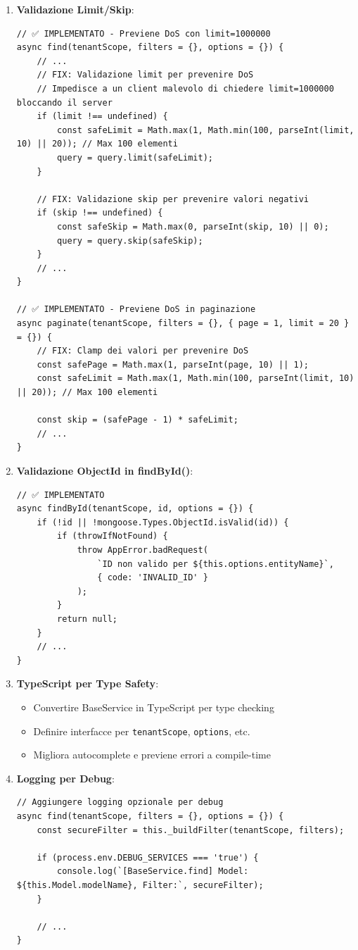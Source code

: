 \documentclass[11pt,a4paper]{article}
\begin{document}
\begin{enumerate}
    \item \textbf{Validazione Limit/Skip}:
    \begin{lstlisting}
// ✅ IMPLEMENTATO - Previene DoS con limit=1000000
async find(tenantScope, filters = {}, options = {}) {
    // ...
    // FIX: Validazione limit per prevenire DoS
    // Impedisce a un client malevolo di chiedere limit=1000000 bloccando il server
    if (limit !== undefined) {
        const safeLimit = Math.max(1, Math.min(100, parseInt(limit, 10) || 20)); // Max 100 elementi
        query = query.limit(safeLimit);
    }
    
    // FIX: Validazione skip per prevenire valori negativi
    if (skip !== undefined) {
        const safeSkip = Math.max(0, parseInt(skip, 10) || 0);
        query = query.skip(safeSkip);
    }
    // ...
}

// ✅ IMPLEMENTATO - Previene DoS in paginazione
async paginate(tenantScope, filters = {}, { page = 1, limit = 20 } = {}) {
    // FIX: Clamp dei valori per prevenire DoS
    const safePage = Math.max(1, parseInt(page, 10) || 1);
    const safeLimit = Math.max(1, Math.min(100, parseInt(limit, 10) || 20)); // Max 100 elementi
    
    const skip = (safePage - 1) * safeLimit;
    // ...
}
    \end{lstlisting}
    
    \item \textbf{Validazione ObjectId in findById()}:
    \begin{lstlisting}
// ✅ IMPLEMENTATO
async findById(tenantScope, id, options = {}) {
    if (!id || !mongoose.Types.ObjectId.isValid(id)) {
        if (throwIfNotFound) {
            throw AppError.badRequest(
                `ID non valido per ${this.options.entityName}`,
                { code: 'INVALID_ID' }
            );
        }
        return null;
    }
    // ...
}
    \end{lstlisting}
    
    \item \textbf{TypeScript per Type Safety}:
    \begin{itemize}
        \item Convertire BaseService in TypeScript per type checking
        \item Definire interfacce per \texttt{tenantScope}, \texttt{options}, etc.
        \item Migliora autocomplete e previene errori a compile-time
    \end{itemize}
    
    \item \textbf{Logging per Debug}:
    \begin{lstlisting}
// Aggiungere logging opzionale per debug
async find(tenantScope, filters = {}, options = {}) {
    const secureFilter = this._buildFilter(tenantScope, filters);
    
    if (process.env.DEBUG_SERVICES === 'true') {
        console.log(`[BaseService.find] Model: ${this.Model.modelName}, Filter:`, secureFilter);
    }
    
    // ...
}
    \end{lstlisting}
\end{enumerate}
\end{document}
